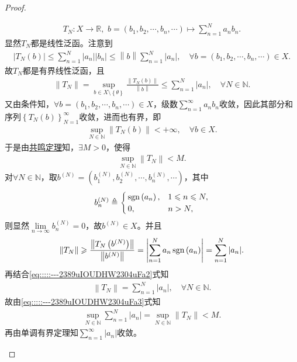\documentclass[../../main.tex]{subfiles}%
\begin{document}
\begin{proof}
\begin{enumerate}[(1)]
\begin{align*}
T_N:X\rightarrow \mathbb{R} ,\,\,b=\left( b_1,b_2,\cdots ,b_n,\cdots \right) \mapsto \sum\limits_{n=1}^N{a_n b_n}.
\end{align*}
显然$T_N$都是线性泛函。注意到
\begin{align*}
\left| T_N\left( b \right) \right|\leqslant \sum\limits_{n=1}^N{\left| a_n \right|\left| b_n \right|}\leqslant \left\| b \right\| \sum\limits_{n=1}^N{\left| a_n \right|},\quad \forall b=\left( b_1,b_2,\cdots ,b_n,\cdots \right) \in X.
\end{align*}
故$T_N$都是有界线性泛函，且
\begin{align}
\left\| T_N \right\| =\sup\limits_{b\in X\setminus \left\{ \theta \right\}}\frac{\left\| T_N\left( b \right) \right\|}{\left\| b \right\|}\leqslant \sum\limits_{n=1}^N{\left| a_n \right|},\quad \forall N\in \mathbb{N}.
\label{eq:::::---2389uIOUDHW2304uFa2}
\end{align}
又由条件知，$\forall b=\left( b_1,b_2,\cdots ,b_n,\cdots \right) \in X$，级数$\sum\limits_{n=1}^{\infty}{a_n b_n}$收敛，因此其部分和序列$\left\{ T_N\left( b \right) \right\}_{N=1}^{\infty}$收敛，进而也有界，即
\begin{align*}
\sup\limits_{N\in \mathbb{N}}\left\| T_N\left( b \right) \right\| <+\infty ,\quad \forall b\in X.
\end{align*}
于是由\hyperref[Functional Analysis-theorem:泛函分析--共鸣定理]{共鸣定理}知，$\exists M>0$，使得
\begin{align}
\sup\limits_{N\in \mathbb{N}}\left\| T_N \right\| <M.
\label{eq:::::---2389uIOUDHW2304uFa3}
\end{align}
对$\forall N\in \mathbb{N}$，取$b^{\left( N \right)}=\left( b_{1}^{\left( N \right)},b_{2}^{\left( N \right)},\cdots ,b_{n}^{\left( N \right)},\cdots \right)$，其中
\begin{align*}
b_{n}^{\left( N \right)}\triangleq
\begin{cases}
\operatorname{sgn} \left( a_n \right) ,&1\leqslant n\leqslant N,\\
0,&n>N,
\end{cases}
\end{align*}
则显然$\lim\limits_{n\rightarrow \infty}b_{n}^{\left( N \right)}=0$，故$b^{\left( N \right)}\in X$。并且
\begin{align*}
\left\| T_N \right\| \geqslant \frac{\left\| T_N\left( b^{\left( N \right)} \right) \right\|}{\left\| b^{\left( N \right)} \right\|}=\left| \sum\limits_{n=1}^N{a_n \operatorname{sgn} \left( a_n \right)} \right|=\sum\limits_{n=1}^N{\left| a_n \right|}.
\end{align*}
再结合\eqref{eq:::::---2389uIOUDHW2304uFa2}式知
\begin{align*}
\left\| T_N \right\| =\sum\limits_{n=1}^N{\left| a_n \right|},\quad \forall N\in \mathbb{N}.
\end{align*}
故由\eqref{eq:::::---2389uIOUDHW2304uFa3}式知
\begin{align*}
\sup\limits_{N\in \mathbb{N}}\sum\limits_{n=1}^N{\left| a_n \right|}=\sup\limits_{N\in \mathbb{N}}\left\| T_N \right\| <M.
\end{align*}
再由单调有界定理知$\sum\limits_{n=1}^{\infty}{\left| a_n \right|}$收敛。


\end{enumerate}
\end{proof}
\end{document}
